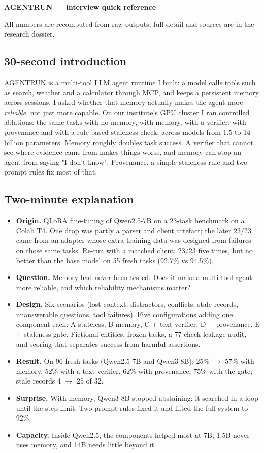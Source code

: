 \documentclass[10pt,a4paper]{article}
\begin{document}
{\sffamily\LARGE\bfseries\color{accent} AGENTRUN — interview quick reference\par}\vspace{4pt}All numbers are recomputed from raw outputs; full detail and sources are in the research dossier.

\subsection*{30-second introduction}
AGENTRUN is a multi-tool LLM agent runtime I built: a model calls tools such as search, weather and a calculator through MCP, and keeps a persistent memory across sessions. I asked whether that memory actually makes the agent more \emph{reliable}, not just more capable. On our institute's GPU cluster I ran controlled ablations: the same tasks with no memory, with memory, with a verifier, with provenance and with a rule-based staleness check, across models from 1.5 to 14 billion parameters. Memory roughly doubles task success. A verifier that cannot see where evidence came from makes things worse, and memory can stop an agent from saying "I don't know". Provenance, a simple staleness rule and two prompt rules fix most of that.

\subsection*{Two-minute explanation}
\begin{itemize}
\item \textbf{Origin.} QLoRA fine-tuning of Qwen2.5-7B on a 23-task benchmark on a Colab T4. One drop was partly a parser and client artefact; the later 23/23 came from an adapter whose extra training data was designed from failures on those same tasks. Re-run with a matched client: 23/23 five times, but no better than the base model on 55 fresh tasks (92.7\% vs 94.5\%).
\item \textbf{Question.} Memory had never been tested. Does it make a multi-tool agent more reliable, and which reliability mechanisms matter?
\item \textbf{Design.} Six scenarios (lost context, distractors, conflicts, stale records, unanswerable questions, tool failures). Five configurations adding one component each: A stateless, B memory, C + text verifier, D + provenance, E + staleness gate. Fictional entities, frozen tasks, a 77-check leakage audit, and scoring that separates success from harmful assertions.
\item \textbf{Result.} On 96 fresh tasks (Qwen2.5-7B and Qwen3-8B): 25\% $\rightarrow$ 57\% with memory, 52\% with a text verifier, 62\% with provenance, 75\% with the gate; stale records 4 $\rightarrow$ 25 of 32.
\item \textbf{Surprise.} With memory, Qwen3-8B stopped abstaining: it searched in a loop until the step limit. Two prompt rules fixed it and lifted the full system to 92\%.
\item \textbf{Capacity.} Inside Qwen2.5, the components helped most at 7B; 1.5B never uses memory, and 14B needs little beyond it.
\end{itemize}
\end{document}
